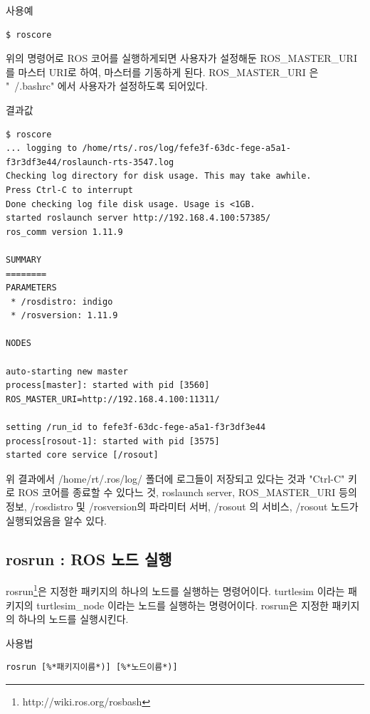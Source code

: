 \noindent
{}\circled{\thenum} 사용예
\begin{lstlisting}[language=ROS]
$ roscore
\end{lstlisting}

\noindent
위의 명령어로 ROS 코어를 실행하게되면 사용자가 설정해둔 ROS\_MASTER\_URI 를 마스터 URI로 하여, 마스터를 기동하게 된다. ROS\_MASTER\_URI 은 "~/.bashrc" 에서 사용자가 설정하도록 되어있다.

\vspace{\baselineskip}
\noindent
{}\circled{\thenum} 결과값
\begin{lstlisting}[language=ROS]
$ roscore
... logging to /home/rts/.ros/log/fefe3f-63dc-fege-a5a1-f3r3df3e44/roslaunch-rts-3547.log
Checking log directory for disk usage. This may take awhile.
Press Ctrl-C to interrupt
Done checking log file disk usage. Usage is <1GB.
started roslaunch server http://192.168.4.100:57385/
ros_comm version 1.11.9

SUMMARY
========
PARAMETERS
 * /rosdistro: indigo
 * /rosversion: 1.11.9

NODES

auto-starting new master
process[master]: started with pid [3560]
ROS_MASTER_URI=http://192.168.4.100:11311/

setting /run_id to fefe3f-63dc-fege-a5a1-f3r3df3e44
process[rosout-1]: started with pid [3575]
started core service [/rosout]
\end{lstlisting}

\noindent
위 결과에서 /home/rt/.ros/log/ 폴더에 로그들이 저장되고 있다는 것과 "Ctrl-C" 키로 ROS 코어를 종료할 수 있다느 것, roslaunch server, ROS\_MASTER\_URI 등의 정보, /rosdistro 및 /rosversion의 파라미터 서버, /rosout 의 서비스, /rosout 노드가 실행되었음을 알수 있다.


\subsection{rosrun : ROS 노드 실행}

rosrun\footnote{http://wiki.ros.org/rosbash}은 지정한 패키지의 하나의 노드를 실행하는 명령어이다. turtlesim 이라는 패키지의 turtlesim\_node 이라는 노드를 실행하는 명령어이다. rosrun은 지정한 패키지의 하나의 노드를 실행시킨다. 

\setcounter{num}{0}

\vspace{\baselineskip}
\noindent
{}\circled{\thenum} 사용법
\begin{lstlisting}[language=ROS]
rosrun [%*패키지이름*)] [%*노드이름*)]
\end{lstlisting}

